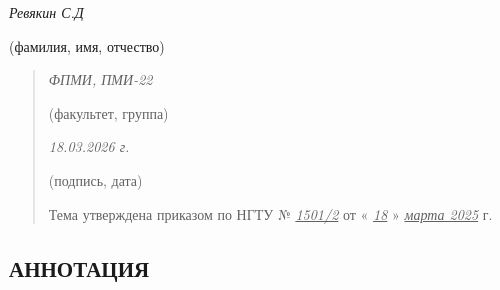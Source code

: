 \documentclass[
]{article}
\begin{document}
\emph{Ревякин С.Д}

(фамилия, имя, отчество)

\begin{quote}
\emph{ФПМИ, ПМИ-22}

(факультет, группа)

\emph{18.03.2026 г.}

(подпись, дата)

Тема утверждена приказом по НГТУ № \emph{\ul{1501/2}} от «
\emph{\ul{18}} » \emph{\ul{марта 2025}} г.
\end{quote}

\hypertarget{ux430ux43dux43dux43eux442ux430ux446ux438ux44f}{%
\subsection*{АННОТАЦИЯ}\label{ux430ux43dux43dux43eux442ux430ux446ux438ux44f}}
\end{document}
